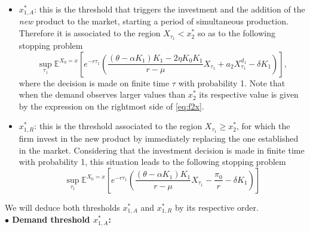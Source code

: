 \begin{itemize}
	\item $x_{1,A}^*$:
	this is the threshold that triggers the investment and the addition of the \textit{new} product to the market, starting a period of simultaneous production. Therefore it is associated to the region $X_{\tau_1} < x^*_2$ so as to the following stopping problem %
	\begin{equation}
	\sup_{\tau_1} \mathds{E}^{X_0=x} \left[ e^{-r \tau_1} \left( \frac{(\theta-\alpha K_1)K_1-2 \eta K_0 K_1}{r-\mu} X_{\tau_1}+
	 a_2 X_{\tau_1}^{d_1} - \delta K_1 \right) \right],
	 \label{3:add}
	 \end{equation}
	 where the decision is made on finite time $\tau$ with probability 1. Note that when the demand observes larger values than $x^*_2$ its respective value is given by the expression on the rightmost side of \eqref{eq:f2x}.
	\item $x_{1,R}^*$: this is the threshold associated to the region $X_{\tau_1} \geq x^*_2$, for which the firm invest in the new product by immediately replacing the one established in the market. Considering that the investment decision is made in finite time with probability 1, this situation leads to the following stopping problem
	\begin{equation}
	\sup_{\tau_1} \mathds{E}^{X_0=x} \left[ e^{-r \tau_1} \left( \frac{(\theta-\alpha K_1)K_1}{r-\mu} X_{\tau_1}-
	\frac{\pi_0}{r} - \delta K_1 \right) \right]
	\label{3:r}
	\end{equation}
\end{itemize}

We will deduce both thresholds $x_{1,A}^*$ and $x_{1,R}^*$ by its respective order.
\\
\textbf{$\bullet$ Demand threshold $x^*_{1,A}$:}

